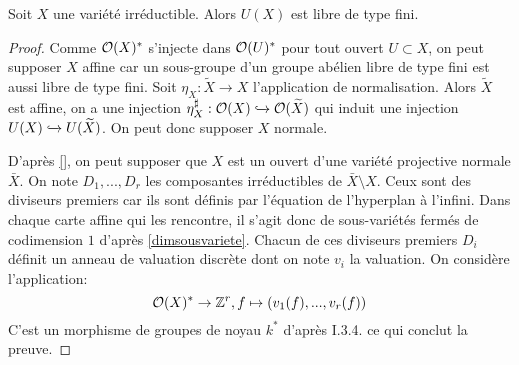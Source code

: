 \begin{prop}
Soit $X$ une variété irréductible. Alors $U(X)$ est libre de type fini.
\end{prop}
\begin{proof}
Comme $\mathcal{O}(X)^*$ s'injecte dans $\mathcal{O}(U)^*$ pour tout ouvert $U\subset X$, on peut supposer $X$ affine car un sous-groupe d'un groupe abélien libre de type fini est aussi libre de type fini. Soit $\eta_X:\widetilde{X}\rightarrow X$ l'application de normalisation. Alors $\widetilde{X}$ est affine, on a une injection $\eta_X^\sharp:\mathcal{O}(X)\xhookrightarrow{}\mathcal{O}(\widetilde{X})$ qui induit une injection $U(X)\xhookrightarrow{}U(\widetilde{X})$. On peut donc supposer $X$ normale.

D'après \ref{}, on peut supposer que $X$ est un ouvert d'une variété projective normale $\bar{X}$. On note $D_1,...,D_r$ les composantes irréductibles de $\bar{X}\setminus X$. Ceux sont des diviseurs premiers car ils sont définis par l'équation de l'hyperplan à l'infini. Dans chaque carte affine qui les rencontre, il s'agit donc de sous-variétés fermés de codimension $1$ d'après \ref{dimsousvariete}. Chacun de ces diviseurs premiers $D_i$ définit un anneau de valuation discrète dont on note $v_i$ la valuation. On considère l'application:
$$\mathcal{O}(X)^*\rightarrow \mathbb{Z}^r, f\mapsto (v_1(f),...,v_r(f))$$
C'est un morphisme de groupes de noyau $k^*$ d'après \cite{Hartshorne} I.3.4. ce qui conclut la preuve.
\end{proof}

